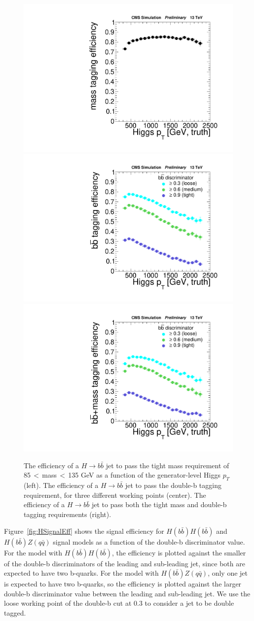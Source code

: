 \begin{figure}
   \begin{center}
      \includegraphics[width=0.32\linewidth]{figs/ptBinnedMassEff.pdf} 
      \includegraphics[width=0.32\linewidth]{figs/doubleBEffH.pdf} 
      \includegraphics[width=0.32\linewidth]{figs/doubleBEffMassWindowHmass.pdf}
      \caption{
         The efficiency of a $H\rightarrow b\bar{b}$ jet to pass the tight mass requirement of 85$\,<\,$mass$\,<\,$135 GeV as a function of the generator-level Higgs $p_{T}$ (left).
         The efficiency of a $H\rightarrow b\bar{b}$ jet to pass the double-b tagging requirement, for three different working points (center).
         The efficiency of a $H\rightarrow b\bar{b}$ jet to pass both the tight mass and double-b tagging requirements (right).
      }
      \label{fig:DoubleBEff}
   \end{center}
\end{figure}

Figure~\ref{fig:HSignalEff} shows the signal efficiency for $H(b\bar{b})H(b\bar{b})$ and $H(b\bar{b})Z(q\bar{q})$ signal models as a function of the double-b discriminator value. For the model with $H(b\bar{b})H(b\bar{b})$, the efficiency is plotted against the smaller of the double-b discriminators of the leading and sub-leading jet, since both are expected to have two b-quarks. For the model with $H(b\bar{b})Z(q\bar{q})$, only one jet is expected to have two b-quarks, so the efficiency is plotted against the larger double-b discriminator value between the leading and sub-leading jet. We use the loose working point of the double-b cut at 0.3 to consider a jet to be double tagged. 

